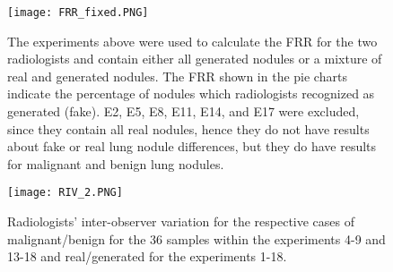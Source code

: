 \documentclass{article}
\begin{document}
\begin{figure*}
\begin{center}

\texttt{[image: FRR\_fixed.PNG]}
\caption{The experiments above were used to calculate the FRR for the two radiologists and contain either all generated nodules or a mixture of real and generated nodules. The FRR shown in the pie charts indicate the percentage of nodules which radiologists recognized as generated (fake). E2, E5, E8, E11, E14, and E17 were excluded, since they contain all real nodules, hence they do not have results about fake or real lung nodule differences, but they do have results for malignant and benign lung nodules.}
  \label{FRR}
\end{center}
\end{figure*}

\begin{figure}
\centering
\texttt{[image: RIV\_2.PNG]}
 \caption{Radiologists' inter-observer variation for the respective cases of malignant/benign for the 36 samples within the experiments 4-9 and 13-18 and real/generated for the experiments 1-18.}
 \label{RIV}
\end{figure}

\vspace{-10 px}
\end{document}
